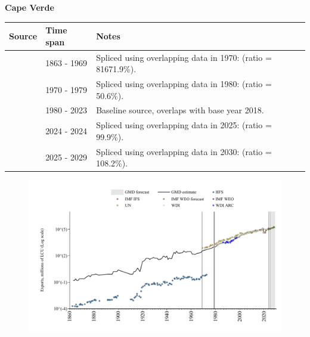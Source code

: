\documentclass[12pt,a4paper,landscape]{article}
\begin{document}
\begin{adjustbox}{max totalsize={\paperwidth}{\paperheight},center}
\begin{minipage}[t][\textheight][t]{\textwidth}
\vspace*{0.5cm}
{}
\begin{center}
{\Large\bfseries Cape Verde}
\end{center}
\vspace{0.5cm}
\begin{table}[H]
\centering
\small
\begin{tabular}{|l|l|l|}
\hline
\textbf{Source} & \textbf{Time span} & \textbf{Notes} \\
\hline
\rowcolor{white}\cite{HFS}& 1863 - 1969 &Spliced using overlapping data in 1970: (ratio = 81671.9\%).\\
\rowcolor{lightgray}\cite{UN}& 1970 - 1979 &Spliced using overlapping data in 1980: (ratio = 50.6\%).\\
\rowcolor{white}\cite{WDI}& 1980 - 2023 &Baseline source, overlaps with base year 2018.\\
\rowcolor{lightgray}\cite{IMF_IFS}& 2024 - 2024 &Spliced using overlapping data in 2025: (ratio = 99.9\%).\\
\rowcolor{white}\cite{IMF_WEO_forecast}& 2025 - 2029 &Spliced using overlapping data in 2030: (ratio = 108.2\%).\\
\hline
\end{tabular}
\end{table}
\begin{figure}[H]
\centering
\includegraphics[width=\textwidth,height=0.6\textheight,keepaspectratio]{graphs/CPV_exports.pdf}
\end{figure}
\end{minipage}
\end{adjustbox}
\end{document}
